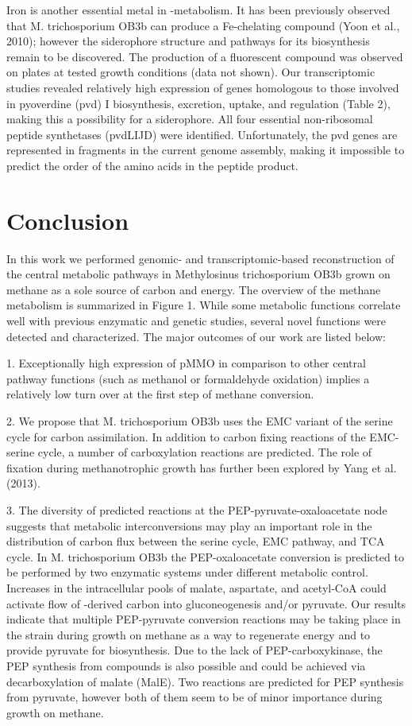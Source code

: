 Iron is another essential metal in -metabolism.
It has been previously observed that M. trichosporium OB3b can produce a Fe-chelating compound (Yoon et al., 2010); however the siderophore structure and pathways for its biosynthesis remain to be discovered.
The production of a fluorescent compound was observed on plates at tested growth conditions (data not shown).
Our transcriptomic studies revealed relatively high expression of genes homologous to those involved in pyoverdine (pvd) I biosynthesis, excretion, uptake, and regulation (Table 2), making this a possibility for a siderophore.
All four essential non-ribosomal peptide synthetases (pvdLIJD) were identified.
Unfortunately, the pvd genes are represented in fragments in the current genome assembly, making it impossible to predict the order of the amino acids in the peptide product.

\section{Conclusion}

In this work we performed genomic- and transcriptomic-based reconstruction of the central metabolic pathways in Methylosinus trichosporium OB3b grown on methane as a sole source of carbon and energy.
The overview of the methane metabolism is summarized in Figure 1.
While some metabolic functions correlate well with previous enzymatic and genetic studies, several novel functions were detected and characterized.
The major outcomes of our work are listed below:

1. Exceptionally high expression of pMMO in comparison to other central pathway functions (such as methanol or formaldehyde oxidation) implies a relatively low turn over at the first step of methane conversion.

2. We propose that M. trichosporium OB3b uses the EMC variant of the serine cycle for carbon assimilation.
In addition to carbon fixing reactions of the EMC-serine cycle, a number of carboxylation reactions are predicted.
The role of  fixation during methanotrophic growth has further been explored by Yang et al. (2013).

3. The diversity of predicted reactions at the PEP-pyruvate-oxaloacetate node suggests that metabolic interconversions may play an important role in the distribution of carbon flux between the serine cycle, EMC pathway, and TCA cycle.
In M. trichosporium OB3b the PEP-oxaloacetate conversion is predicted to be performed by two enzymatic systems under different metabolic control.
Increases in the intracellular pools of malate, aspartate, and acetyl-CoA could activate flow of -derived carbon into gluconeogenesis and/or pyruvate.
Our results indicate that multiple PEP-pyruvate conversion reactions may be taking place in the strain during growth on methane as a way to regenerate energy and to provide pyruvate for biosynthesis.
Due to the lack of PEP-carboxykinase, the PEP synthesis from  compounds is also possible and could be achieved via decarboxylation of malate (MalE).
Two reactions are predicted for PEP synthesis from pyruvate, however both of them seem to be of minor importance during growth on methane.

